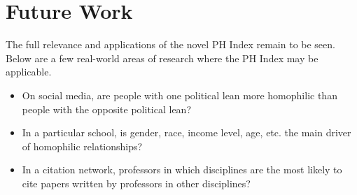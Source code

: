 \documentclass{article}
\begin{document}
\section{Future Work}

The full relevance and applications of the novel PH Index remain to be
seen. Below are a few real-world areas of research where the PH Index
may be applicable.

\begin{itemize}
\item
  On social media, are people with one political lean more homophilic
  than people with the opposite political lean?
\item
  In a particular school, is gender, race, income level, age, etc. the
  main driver of homophilic relationships?
\item
  In a citation network, professors in which disciplines are the most
  likely to cite papers written by professors in other disciplines?
\end{itemize}




  \clearpage 
\nocite{*}
 
\end{document}
